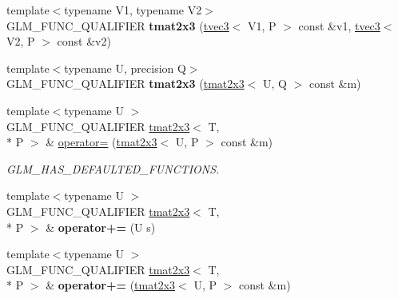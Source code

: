 \begin{DoxyCompactItemize}
\item 
\hypertarget{structglm_1_1tmat2x3_a4cb1b9991bfa8f25e56a637081d4ee67}{{\footnotesize template$<$typename V1, typename V2$>$ }\\G\-L\-M\-\_\-\-F\-U\-N\-C\-\_\-\-Q\-U\-A\-L\-I\-F\-I\-E\-R {\bfseries tmat2x3} (\hyperlink{structglm_1_1tvec3}{tvec3}$<$ V1, P $>$ const \&v1, \hyperlink{structglm_1_1tvec3}{tvec3}$<$ V2, P $>$ const \&v2)}\label{structglm_1_1tmat2x3_a4cb1b9991bfa8f25e56a637081d4ee67}

\item 
\hypertarget{structglm_1_1tmat2x3_a9a042a9919399f8eed6946601dbb79da}{{\footnotesize template$<$typename U, precision Q$>$ }\\G\-L\-M\-\_\-\-F\-U\-N\-C\-\_\-\-Q\-U\-A\-L\-I\-F\-I\-E\-R {\bfseries tmat2x3} (\hyperlink{structglm_1_1tmat2x3}{tmat2x3}$<$ U, Q $>$ const \&m)}\label{structglm_1_1tmat2x3_a9a042a9919399f8eed6946601dbb79da}

\item 
\hypertarget{structglm_1_1tmat2x3_a864869c76356750495b6d4172c8d84a3}{{\footnotesize template$<$typename U $>$ }\\G\-L\-M\-\_\-\-F\-U\-N\-C\-\_\-\-Q\-U\-A\-L\-I\-F\-I\-E\-R \hyperlink{structglm_1_1tmat2x3}{tmat2x3}$<$ T, \\*
P $>$ \& \hyperlink{structglm_1_1tmat2x3_a864869c76356750495b6d4172c8d84a3}{operator=} (\hyperlink{structglm_1_1tmat2x3}{tmat2x3}$<$ U, P $>$ const \&m)}\label{structglm_1_1tmat2x3_a864869c76356750495b6d4172c8d84a3}

\begin{DoxyCompactList}\small\item\em G\-L\-M\-\_\-\-H\-A\-S\-\_\-\-D\-E\-F\-A\-U\-L\-T\-E\-D\-\_\-\-F\-U\-N\-C\-T\-I\-O\-N\-S. \end{DoxyCompactList}\item 
\hypertarget{structglm_1_1tmat2x3_a59f119877649405d4697179f9f281c0c}{{\footnotesize template$<$typename U $>$ }\\G\-L\-M\-\_\-\-F\-U\-N\-C\-\_\-\-Q\-U\-A\-L\-I\-F\-I\-E\-R \hyperlink{structglm_1_1tmat2x3}{tmat2x3}$<$ T, \\*
P $>$ \& {\bfseries operator+=} (U s)}\label{structglm_1_1tmat2x3_a59f119877649405d4697179f9f281c0c}

\item 
\hypertarget{structglm_1_1tmat2x3_aeedada1605cb25ac7e5e22b09c85df08}{{\footnotesize template$<$typename U $>$ }\\G\-L\-M\-\_\-\-F\-U\-N\-C\-\_\-\-Q\-U\-A\-L\-I\-F\-I\-E\-R \hyperlink{structglm_1_1tmat2x3}{tmat2x3}$<$ T, \\*
P $>$ \& {\bfseries operator+=} (\hyperlink{structglm_1_1tmat2x3}{tmat2x3}$<$ U, P $>$ const \&m)}\label{structglm_1_1tmat2x3_aeedada1605cb25ac7e5e22b09c85df08}


\end{DoxyCompactItemize}
